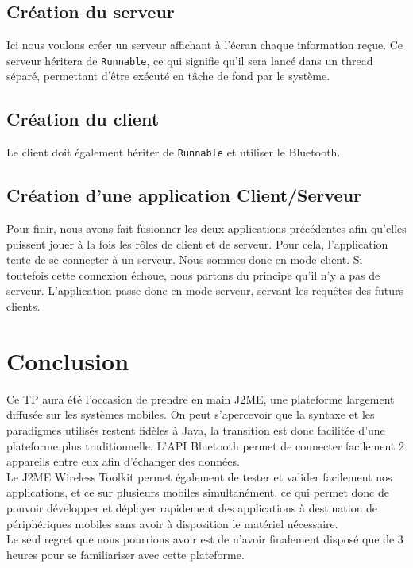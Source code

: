 \documentclass[a4paper]{article}
\begin{document}
\subsection{Création du serveur}
Ici nous voulons créer un serveur affichant à l'écran chaque information
reçue. Ce serveur héritera de \verb?Runnable?, ce qui signifie qu'il sera
lancé dans un thread séparé, permettant d'être exécuté en tâche de fond par
le système.


\subsection{Création du client}
Le client doit également hériter de \verb?Runnable? et utiliser le Bluetooth.



\subsection{Création d'une application Client/Serveur}
Pour finir, nous avons fait fusionner les deux applications précédentes afin
qu'elles puissent jouer à la fois les rôles de client et de serveur. Pour
cela, l'application tente de se connecter à un serveur. Nous sommes donc en
mode client. Si toutefois cette connexion échoue, nous partons du principe
qu'il n'y a pas de serveur. L'application passe donc en mode serveur,
servant les requêtes des futurs clients.




\section{Conclusion}
Ce TP aura été l'occasion de prendre en main J2ME, une plateforme largement
diffusée sur les systèmes mobiles. On peut s'apercevoir que la syntaxe et
les paradigmes utilisés restent fidèles à Java, la transition est donc
facilitée d'une plateforme plus traditionnelle. L'API Bluetooth permet de
connecter facilement 2 appareils entre eux afin d'échanger des données.\\

Le J2ME Wireless Toolkit permet également de tester et valider facilement
nos applications, et ce sur plusieurs mobiles simultanément, ce qui permet
donc de pouvoir développer et déployer rapidement des applications à
destination de périphériques mobiles sans avoir à disposition le matériel
nécessaire.\\

Le seul regret que nous pourrions avoir est de n'avoir finalement disposé
que de 3 heures pour se familiariser avec cette plateforme.
\end{document}
